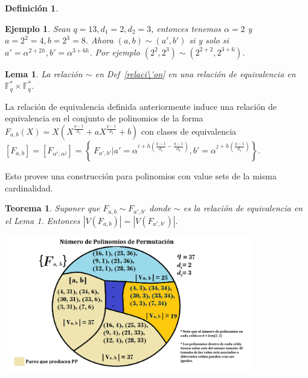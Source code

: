 \documentclass[landscape,final,paperwidth=24in,paperheight=36in]{baposter}
\newtheorem*{ejemplo*}{Ejemplo}
\newtheorem{definicion}{Definici\'on}
\newtheorem{lema}{Lema}
\newtheorem{teorema}{Teorema}
\begin{document}
\begin{poster}
{\begin{definicion}
\end{definicion}

  \begin{ejemplo*}
    Sean $q = 13, d_1 = 2, d_2 = 3$, entonces tenemos $\alpha = 2$ y $a = 2^2 = 4, b = 2^3 = 8$. Ahora $(a,b) \sim (a',b')$ si y solo si
    $a' = \alpha^{2+2h}, b' = \alpha^{3+6h}$. Por ejemplo $(2^2,2^3) \sim (2^{2+2},2^{3+6})$.
  \end{ejemplo*}

\begin{lema}
  
  La relaci\'on $\sim$ en Def~\ref{relaci\'on} en una relaci\'on de equivalencia en $\mathbb{F}_q^* \times \mathbb{F}_q^*$.

\end{lema}

  La relaci\'on de equivalencia definida anteriormente induce una relaci\'on de equivalencia en el conjunto de polinomios de la forma $F_{a,b}(X) = X(X^{\frac{q-1}{d_1}} + aX^{\frac{q-1}{d_2}} +b)$ con clases de equivalencia $[F_{a,b}] = [F_{\alpha^i, \alpha^j}] = \left\{\ F_{a',b'} | a' = \alpha^{i+h(\frac{q-1}{d_1} - \frac{q-1}{d_2})}, b' = \alpha^{j+h(\frac{q-1}{d_1})} \right\}$.

  Esto provee una construcci\'{o}n para polinomios con value sets de la misma cardinalidad.
\begin{teorema}
  
  Suponer que $F_{a,b} \sim F_{a',b'}$ donde $\sim$ es la relaci\'on de equivalencia en el Lema 1. Entonces $|V(F_{a,b})| = |V(F_{a',b'})|$.

\end{teorema}

\includegraphics[width=11cm, height=6cm]{clases-espa}

}\label{Results}


\end{poster}
\end{document}
